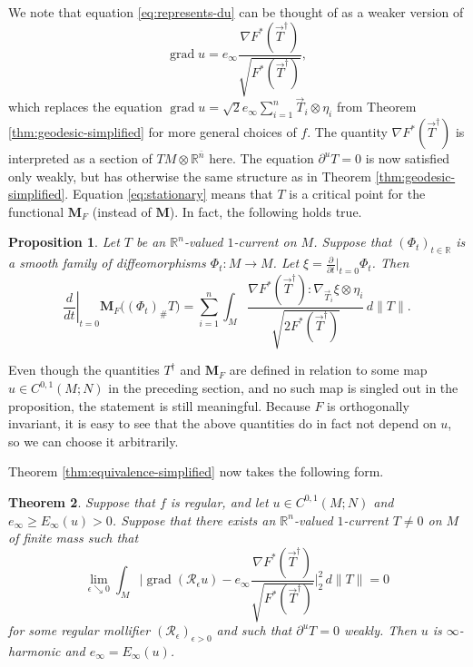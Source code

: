 \documentclass[10pt,a4paper]{amsart}
\newcommand{\R}{\mathbb{R}}
\newcommand{\M}{\mathbf{M}}
\newcommand{\ndim}{{\bar{n}}}
\DeclareMathOperator{\grad}{grad}
\newcommand{\dd}[2]{\frac{\partial #1}{\partial #2}}
\newtheorem{theorem}{Theorem}
\newtheorem{proposition}[theorem]{Proposition}
\begin{document}
We note that equation \eqref{eq:represents-du} can be thought of as a weaker version of
\begin{equation} \label{eq:pointwise-equation-for-du}
\grad u = e_\infty \frac{\nabla F^*(\vec{T}^\dagger)}{\sqrt{F^*(\vec{T}^\dagger)}},
\end{equation}
which replaces the equation $\grad u = \sqrt{2} e_\infty \sum_{i = 1}^n \vec{T}_i \otimes \eta_i$ from Theorem \ref{thm:geodesic-simplified} for more general choices of $f$. The quantity
$\nabla F^*(\vec{T}^\dagger)$ is interpreted as a section of $TM \otimes \R^\ndim$ here. The equation
$\partial^u T = 0$ is now satisfied only weakly, but has otherwise the same structure as in Theorem \ref{thm:geodesic-simplified}.
Equation \eqref{eq:stationary} means that $T$ is a critical point for the functional $\M_F$ (instead of $\M$). In fact, the following holds true.

\begin{proposition} \label{prp:first-variation-of-mass}
Let $T$ be an $\R^n$-valued $1$-current on $M$. Suppose that $(\Phi_t)_{t \in \R}$ is a smooth family of diffeomorphisms $\Phi_t \colon M \to M$. Let
$\xi = \dd{}{t}|_{t = 0} \Phi_t$.
Then
\[
\left.\frac{d}{dt}\right|_{t = 0} \M_F\bigl((\Phi_t)_\# T\bigr) = \sum_{i = 1}^n \int_M \frac{\nabla F^*(\vec{T}^\dagger) : \nabla_{\vec{T}_i} \xi \otimes \eta_i}{\sqrt{2F^*(\vec{T}^\dagger)}} \, d\|T\|.
\]
\end{proposition}

Even though the quantities $T^\dagger$ and $\M_F$ are defined in relation to some
map $u \in C^{0, 1}(M; N)$ in the preceding section, and no such map is
singled out in the proposition, the statement is still meaningful.
Because $F$ is orthogonally invariant, it is easy to see that the above quantities do in fact not depend on $u$, so we can choose it arbitrarily.

Theorem \ref{thm:equivalence-simplified} now takes the following form.

\begin{theorem} \label{thm:equivalence}
Suppose that $f$ is regular, and
let $u \in C^{0, 1}(M; N)$ and $e_\infty \ge E_\infty(u) > 0$. Suppose that
there exists an $\R^n$-valued $1$-current $T \neq 0$ on $M$ of finite mass such that
\[
\lim_{\epsilon \searrow 0} \int_M \biggl|\grad(\mathcal{R}_\epsilon u) - e_\infty \frac{\nabla F^*(\vec{T}^\dagger)}{\sqrt{F^*(\vec{T}^\dagger)}}\biggr|_2^2 \, d\|T\| = 0
\]
for some regular mollifier $(\mathcal{R}_\epsilon)_{\epsilon >0}$ and such that
$\partial^u T = 0$ weakly.
Then $u$ is $\infty$-harmonic and $e_\infty = E_\infty(u)$.
\end{theorem}
\end{document}
